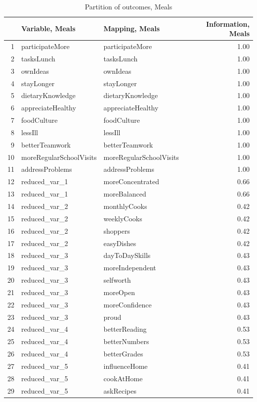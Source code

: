 \documentclass[12pt, a4paper, titlepage]{article}\usepackage[]{graphicx}\usepackage[]{color}
\begin{document}
\begin{table}[ht]
\centering
\begin{tabular}{rllr}
  \hline
 & Variable, Meals & Mapping, Meals & Information, Meals \\ 
  \hline
1 & participateMore & participateMore & 1.00 \\ 
  2 & tasksLunch & tasksLunch & 1.00 \\ 
  3 & ownIdeas & ownIdeas & 1.00 \\ 
  4 & stayLonger & stayLonger & 1.00 \\ 
  5 & dietaryKnowledge & dietaryKnowledge & 1.00 \\ 
  6 & appreciateHealthy & appreciateHealthy & 1.00 \\ 
  7 & foodCulture & foodCulture & 1.00 \\ 
  8 & lessIll & lessIll & 1.00 \\ 
  9 & betterTeamwork & betterTeamwork & 1.00 \\ 
  10 & moreRegularSchoolVisits & moreRegularSchoolVisits & 1.00 \\ 
  11 & addressProblems & addressProblems & 1.00 \\ 
  12 & reduced\_var\_1 & moreConcentrated & 0.66 \\ 
  13 & reduced\_var\_1 & moreBalanced & 0.66 \\ 
  14 & reduced\_var\_2 & monthlyCooks & 0.42 \\ 
  15 & reduced\_var\_2 & weeklyCooks & 0.42 \\ 
  16 & reduced\_var\_2 & shoppers & 0.42 \\ 
  17 & reduced\_var\_2 & easyDishes & 0.42 \\ 
  18 & reduced\_var\_3 & dayToDaySkills & 0.43 \\ 
  19 & reduced\_var\_3 & moreIndependent & 0.43 \\ 
  20 & reduced\_var\_3 & selfworth & 0.43 \\ 
  21 & reduced\_var\_3 & moreOpen & 0.43 \\ 
  22 & reduced\_var\_3 & moreConfidence & 0.43 \\ 
  23 & reduced\_var\_3 & proud & 0.43 \\ 
  24 & reduced\_var\_4 & betterReading & 0.53 \\ 
  25 & reduced\_var\_4 & betterNumbers & 0.53 \\ 
  26 & reduced\_var\_4 & betterGrades & 0.53 \\ 
  27 & reduced\_var\_5 & influenceHome & 0.41 \\ 
  28 & reduced\_var\_5 & cookAtHome & 0.41 \\ 
  29 & reduced\_var\_5 & askRecipes & 0.41 \\ 
   \hline
\end{tabular}
\caption{Partition of outcomes, Meals} 
\end{table}
\end{document}
